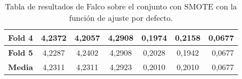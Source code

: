 \begin{table}[H]
{\begin{tabular}{|crrrrrr|}
\multicolumn{1}{|c|}{\textbf{Fold 4}} & \multicolumn{1}{c|}{4,2372}            & \multicolumn{1}{c|}{4,2057}              & \multicolumn{1}{c|}{4,2908}          & \multicolumn{1}{c|}{0,1974}            & \multicolumn{1}{c|}{0,2158}              & 0,0677                             \\ \hline
\multicolumn{1}{|c|}{\textbf{Fold 5}} & \multicolumn{1}{c|}{4,2287}            & \multicolumn{1}{c|}{4,2402}              & \multicolumn{1}{c|}{4,2908}          & \multicolumn{1}{c|}{0,2028}            & \multicolumn{1}{c|}{0,1942}              & 0,0677                             \\ \hline
\multicolumn{1}{|c|}{\textbf{Media}}  & \multicolumn{1}{c|}{4,2311}           & \multicolumn{1}{c|}{4,2311}             & \multicolumn{1}{c|}{4,2923}         & \multicolumn{1}{c|}{0,2010}           & \multicolumn{1}{c|}{0,2010}             & 0,0677                             \\ \hline
\end{tabular}%
}
\caption{Tabla de resultados de Falco sobre el conjunto con SMOTE con la función de ajuste por defecto.}\label{tablaFALCOconSMOTEdefecto}
\end{table}

